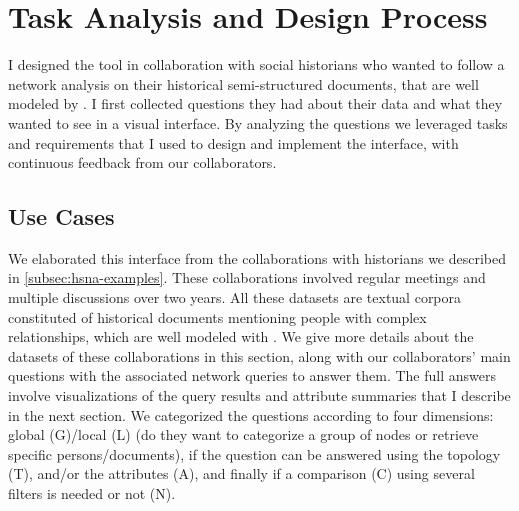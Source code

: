 \section{Task Analysis and Design Process}\label{sec:combinet-tasks}

I designed the \name tool in collaboration with social historians who wanted to follow a network analysis on their historical semi-structured documents, that are well modeled by \modelplural.
I first collected questions they had about their data and what they wanted to see in a visual interface.
By analyzing the questions we leveraged tasks and requirements that I used to design and implement the interface, with continuous feedback from our collaborators.

\subsection{Use Cases}

We elaborated this interface from the collaborations with historians we described in \autoref{subsec:hsna-examples}.
These collaborations involved regular meetings and multiple discussions over two years.
All these datasets are textual corpora constituted of historical documents mentioning people with complex relationships, which are well modeled with \modelplural.
We give more details about the datasets of these collaborations in this section, along with our collaborators' main questions with the associated network queries to answer them.
The full answers involve visualizations of the query results and attribute summaries that I describe in the next section.
We categorized the questions according to four dimensions: global (G)/local (L) (do they want to categorize a group of nodes or retrieve specific persons/documents), if the question can be answered using the topology (T), and/or the attributes (A), and finally if a comparison (C) using several filters is needed or not (N).

